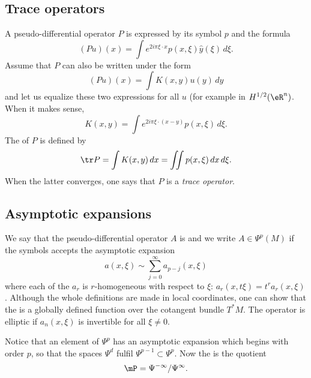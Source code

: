 \subsection{Trace operators}  \label{subsec_traceop}

A pseudo-differential operator $P$ is expressed by its symbol $p$ and the formula
\[
	(Pu)(x)=\int  e^{2i\pi \xi\cdot x}p(x,\xi)\hat y(\xi)\,d\xi.
\]
Assume that $P$ can also be written under the form
\[
	(Pu)(x)=\int K(x,y)u(y)\,dy
\]
and let us equalize these two expressions for all $u$ (for example in $H^{1/2}(\eR^n)$. When it makes sense,
\begin{equation}
	K(x,y)=\int e^{2i\pi \xi\cdot (x-y)}p(x,\xi)\,d\xi.
\end{equation}
The  of $P$ is defined by
\begin{equation}
	\tr P=\int K(x,y)\,dx
	=\iint p(x,\xi)\,dx\,d\xi.
\end{equation}
When the latter converges, one says that $P$ is a \emph{trace operator}.

\subsection{Asymptotic expansions}

We say that the pseudo-differential operator $A$ is  and we write $A\in\Psi^p(M)$ if the symbols accepts the asymptotic expansion
\[
	a(x,\xi)\sim\sum_{j=0}^{\infty}a_{p-j}(x,\xi)
\]
where each of the $a_r$ is $r$-homogeneous with respect to $\xi$: $a_r(x,t\xi)=t^ra_r(x,\xi)$. Although the whole definitions are made in local coordinates, one can show that the  is a globally defined function over the cotangent bundle $T^*M$. The operator is elliptic if $a_n(x,\xi)$ is invertible for all $\xi\neq 0$.

Notice that an element of $\Psi^p$ has an asymptotic expansion which begins with order $p$, so that the spaces $\Psi^d$ fulfil $\Psi^{p-1}\subset\Psi^p$. Now the  is the quotient
\begin{equation}		\label{EqDefmPalgOpeClass}
	\mP=\Psi^{-\infty}/\Psi^{\infty}.
\end{equation}

